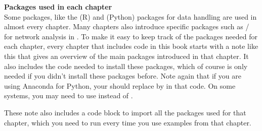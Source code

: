 \begin{feature}
\textbf{Packages used in each chapter}\\
Some packages, like the  (R) and  (Python) packages for data handling are used in almost every chapter.
Many chapters also introduce specific packages such as / for network analysis in .
To make it easy to keep track of the packages needed for each chapter,
every chapter that includes code in this book starts with a note like this that gives an overview of the main packages introduced in that chapter.
It also includes the code needed to install these packages, which of course is only needed if you didn't install these packages before.
Note again that if you are using Anaconda for Python,
your should replace  by  in that code. On some systems, you may need to use  instead of .

These note also includes a code block to import all the packages used for that chapter,
which you need to run every time you use examples from that chapter.
\end{feature}
